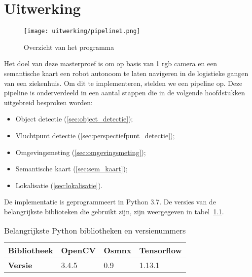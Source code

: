 
\chapter{Uitwerking}

\begin{figure}[!h]
    \centering
    \texttt{[image: uitwerking/pipeline1.png]}
    \caption{Overzicht van het programma}
    \label{fig:pipeline1}
\end{figure}

Het doel van deze masterproef is om op basis van 1 \gls{rgb} camera en een semantische kaart een robot autonoom te laten navigeren in de logistieke gangen van een ziekenhuis.
Om dit te implementeren, stelden we een pipeline op.
Deze pipeline is onderverdeeld in een aantal stappen die in de volgende hoofdstukken uitgebreid besproken worden:
\begin{itemize}
    \item Object detectie (\ref{sec:object_detectie});
    \item Vluchtpunt detectie (\ref{sec:perspectiefpunt_detectie});
    \item Omgevingsmeting (\ref{sec:omgevingsmeting});
    \item Semantische kaart (\ref{sec:sem_kaart});
    \item Lokalisatie (\ref{sec:lokalisatie}).
\end{itemize}

De implementatie is geprogrammeert in Python 3.7. De versies van de belangrijkste biblioteken die gebruikt zijn, zijn weergegeven in tabel~\ref{tab:versies}.

\begin{table}
    \centering
    \caption{Belangrijkste Python bibliotheken en versienummers}
    \label{tab:versies}
    \begin{tabular}{l|l|l|l}
        \textbf{Bibliotheek} & OpenCV & Osmnx & Tensorflow \\
        \hline
        \textbf{Versie} & 3.4.5 & 0.9 & 1.13.1 \\
    \end{tabular}
\end{table}


